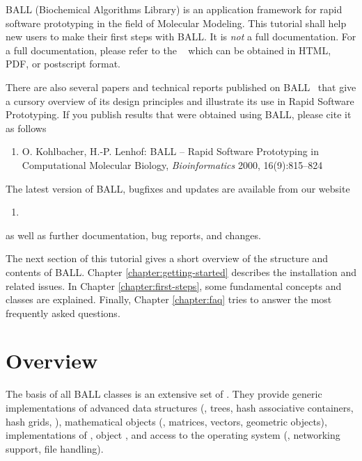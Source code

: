 BALL (Biochemical Algorithms Library) is an application framework for rapid
software prototyping in the field of Molecular Modeling.  This tutorial shall
help new users to make their first steps with BALL. It is {\em not} a full
documentation. For a full documentation, please refer to the ~\cite{BALL-RM} which can be obtained in HTML, PDF, or postscript format.

There are also several papers and technical reports published on
BALL~\cite{BKL2000,BKL99a,BKL99b,KL99} that give a cursory overview of its design
principles and illustrate its use in Rapid Software Prototyping. If you
publish results that were obtained using BALL, please cite it as follows
\begin{enumerate}
	\item[] O. Kohlbacher, H.-P. Lenhof: BALL -- Rapid Software Prototyping
  in Computational Molecular Biology, {\em Bioinformatics} 2000,
	16(9):815--824
\end{enumerate}

\noindent
The latest version of BALL, bugfixes and updates are available from our website

\begin{enumerate}
  \item[] 
\end{enumerate}

\noindent 
as well as further documentation, bug reports, and changes.

The next section of this tutorial gives a short overview of the structure and
contents of BALL. Chapter \ref{chapter:getting-started} describes the
installation and related issues. In Chapter \ref{chapter:first-steps}, some
fundamental concepts and classes are explained. Finally, Chapter
\ref{chapter:faq} tries to answer the most frequently asked questions.

\section{Overview}


The basis of all BALL classes is an extensive set of .  They provide generic implementations of advanced data structures
(\eg, trees, hash associative containers, hash grids, \etc), mathematical
objects (\eg, matrices, vectors, geometric objects), implementations of
, object , and access to the
operating system (\eg, networking support, file handling).

